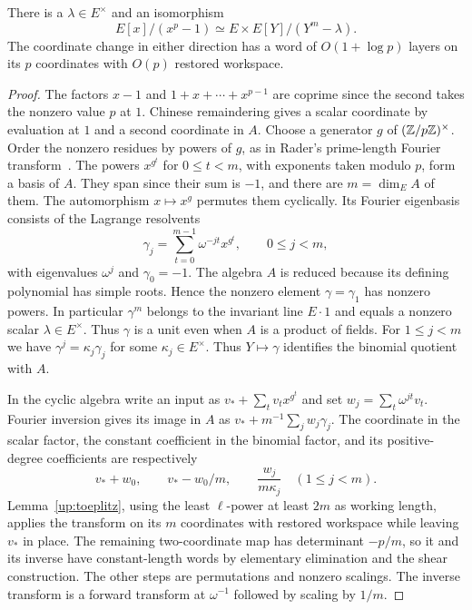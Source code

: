 \begin{lemma}\label{poly:lem:descent-prime}
There is a $\lambda\in E^\times$ and an isomorphism
\[
 E[x]/(x^p-1)\simeq E\times E[Y]/(Y^m-\lambda).
\]
The coordinate change in either direction has a word of
$O(1+\log p)$ layers on its $p$ coordinates with $O(p)$ restored workspace.
\end{lemma}
\begin{proof}
The factors $x-1$ and $1+x+\cdots+x^{p-1}$ are coprime since the
second takes the nonzero value $p$ at $1$. Chinese remaindering
gives a scalar coordinate by evaluation at $1$ and a second coordinate
in $A$. Choose a generator $g$ of $(\mathbb Z/p\mathbb Z)^\times$.
Order the nonzero residues by powers of $g$, as in Rader's
prime-length Fourier transform~\cite{rader}. The powers $x^{g^t}$ for
$0\le t<m$, with exponents taken modulo $p$, form a basis of $A$. They span since their sum is $-1$, and there
are $m=\dim_E A$ of them. The automorphism $x\mapsto x^g$ permutes
them cyclically. Its Fourier eigenbasis consists of the Lagrange resolvents
\[
 \gamma_j=\sum_{t=0}^{m-1}\omega^{-jt}x^{g^t},
 \qquad 0\le j<m,
\]
with eigenvalues $\omega^j$ and $\gamma_0=-1$. The algebra $A$ is
reduced because its defining polynomial has simple roots. Hence the
nonzero element $\gamma=\gamma_1$ has nonzero powers. In particular
$\gamma^m$ belongs to the invariant line $E\cdot1$ and equals a
nonzero scalar $\lambda\in E^\times$. Thus $\gamma$ is a unit even
when $A$ is a product of fields. For $1\le j<m$ we have
$\gamma^j=\kappa_j\gamma_j$ for some $\kappa_j\in E^\times$.
Thus $Y\mapsto\gamma$ identifies the binomial quotient with $A$.

In the cyclic algebra write an input as
$v_*+\sum_t v_t x^{g^t}$ and set $w_j=\sum_t\omega^{jt}v_t$.
Fourier inversion gives its image in $A$ as
$v_*+m^{-1}\sum_j w_j\gamma_j$. The coordinate in the scalar factor,
the constant coefficient in the binomial factor, and its positive-degree
coefficients are respectively
\[
  v_*+w_0,\qquad v_*-w_0/m,\qquad
  \frac{w_j}{m\kappa_j}\quad(1\le j<m).
\]
Lemma~\ref{up:toeplitz}, using the least $\ell$-power at least $2m$ as working length, applies the transform on its $m$
coordinates with restored workspace while leaving $v_*$ in place. The remaining two-coordinate
map has determinant $-p/m$, so it and its inverse have constant-length
words by elementary elimination and the shear construction.
The other steps are permutations and nonzero scalings.
The inverse transform is a forward transform at $\omega^{-1}$ followed
by scaling by $1/m$.
\end{proof}

